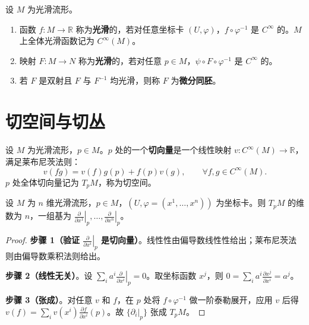 \begin{definition}[光滑函数与光滑映射]\label{def:smooth_function_map}
设 $M$ 为光滑流形。
\begin{enumerate}[label=(\roman*)]
    \item 函数 $f: M \to \mathbb{R}$ 称为\textbf{光滑}的，若对任意坐标卡 $(U, \varphi)$，$f \circ \varphi^{-1}$ 是 $C^\infty$ 的。$M$ 上全体光滑函数记为 $C^\infty(M)$。
    \item 映射 $F: M \to N$ 称为\textbf{光滑}的，若对任意 $p \in M$，$\psi \circ F \circ \varphi^{-1}$ 是 $C^\infty$ 的。
    \item 若 $F$ 是双射且 $F$ 与 $F^{-1}$ 均光滑，则称 $F$ 为\textbf{微分同胚}。
\end{enumerate}
\end{definition}

\section{切空间与切丛}

\begin{definition}\label{def:tangent_vector_derivation}
设 $M$ 为光滑流形，$p \in M$。$p$ 处的一个\textbf{切向量}是一个线性映射 $v: C^\infty(M) \to \mathbb{R}$，满足莱布尼茨法则：
\[
v(fg) = v(f) g(p) + f(p) v(g), \qquad \forall f, g \in C^\infty(M).
\]
$p$ 处全体切向量记为 $T_pM$，称为切空间。
\end{definition}

\begin{proposition}[切空间的维数与坐标基]\label{prop:tangent_space_basis}
设 $M$ 为 $n$ 维光滑流形，$p \in M$，$(U, \varphi = (x^1, \dots, x^n))$ 为坐标卡。则 $T_pM$ 的维数为 $n$，一组基为 $\left. \frac{\partial}{\partial x^1} \right|_p, \dots, \left. \frac{\partial}{\partial x^n} \right|_p$。
\end{proposition}

\begin{proof}
\textbf{步骤 1（验证 $\left. \frac{\partial}{\partial x^i} \right|_p$ 是切向量）}。线性性由偏导数线性性给出；莱布尼茨法则由偏导数乘积法则给出。

\textbf{步骤 2（线性无关）}。设 $\sum_i a^i \left. \frac{\partial}{\partial x^i} \right|_p = 0$。取坐标函数 $x^j$，则 $0 = \sum_i a^i \frac{\partial x^j}{\partial x^i} = a^j$。

\textbf{步骤 3（张成）}。对任意 $v$ 和 $f$，在 $p$ 处将 $f \circ \varphi^{-1}$ 做一阶泰勒展开，应用 $v$ 后得 $v(f) = \sum_i v(x^i) \frac{\partial f}{\partial x^i}(p)$。故 $\{ \partial_i|_p \}$ 张成 $T_pM$。
\end{proof}

